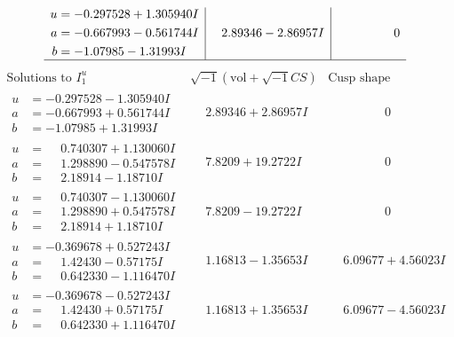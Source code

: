\documentclass[1p]{elsarticle_modified}
\theoremstyle{definition}
\newcommand{\I}{\sqrt{-1}}
\begin{document}
$$\begin{array}{c|c|c}
\begin{aligned}
u &= -0.297528 + 1.305940 I \\
a &= -0.667993 - 0.561744 I \\
b &= -1.07985 - 1.31993 I\end{aligned}
 & \phantom{-}2.89346 - 2.86957 I & \phantom{-0.000000 } 0\\
 \hline 
 \end{array}$$\newpage$$\begin{array}{c|c|c}  
\text{Solutions to }I^u_{1}& \I (\text{vol} + \sqrt{-1}CS) & \text{Cusp shape}\\
 \hline 
\begin{aligned}
u &= -0.297528 - 1.305940 I \\
a &= -0.667993 + 0.561744 I \\
b &= -1.07985 + 1.31993 I\end{aligned}
 & \phantom{-}2.89346 + 2.86957 I & \phantom{-0.000000 } 0 \\ \hline\begin{aligned}
u &= \phantom{-}0.740307 + 1.130060 I \\
a &= \phantom{-}1.298890 - 0.547578 I \\
b &= \phantom{-}2.18914 - 1.18710 I\end{aligned}
 & \phantom{-}7.8209 + 19.2722 I & \phantom{-0.000000 } 0 \\ \hline\begin{aligned}
u &= \phantom{-}0.740307 - 1.130060 I \\
a &= \phantom{-}1.298890 + 0.547578 I \\
b &= \phantom{-}2.18914 + 1.18710 I\end{aligned}
 & \phantom{-}7.8209 - 19.2722 I & \phantom{-0.000000 } 0 \\ \hline\begin{aligned}
u &= -0.369678 + 0.527243 I \\
a &= \phantom{-}1.42430 - 0.57175 I \\
b &= \phantom{-}0.642330 - 1.116470 I\end{aligned}
 & \phantom{-}1.16813 - 1.35653 I & \phantom{-}6.09677 + 4.56023 I \\ \hline\begin{aligned}
u &= -0.369678 - 0.527243 I \\
a &= \phantom{-}1.42430 + 0.57175 I \\
b &= \phantom{-}0.642330 + 1.116470 I\end{aligned}
 & \phantom{-}1.16813 + 1.35653 I & \phantom{-}6.09677 - 4.56023 I \\ \hline\begin{aligned}

\end{aligned}
\end{array}$$
\end{document}
